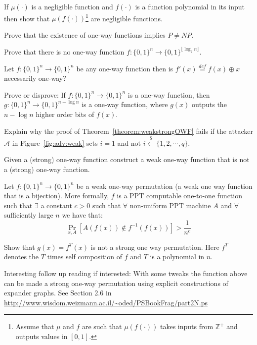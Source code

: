 \begin{exercise}
\label{ex:product} If $\mu(\cdot)$ is a negligible function and $f(\cdot)$ is a function polynomial in its input then show that $\mu(f(\cdot))$\footnote{Assume that $\mu$ and $f$ are such that $\mu(f(\cdot))$ takes inputs from $\mathbb{Z}^+$ and outputs values in $[0,1]$.} are negligible functions.
\end{exercise}

\begin{exercise}\label{ex:PNP} Prove that the existence of one-way functions implies $P \neq NP$.
\end{exercise}

\begin{exercise}
Prove that there is no one-way function $f:\{0,1\}^n\to \{0,1\}^{\lfloor \log_2 n\rfloor}$.
\end{exercise}


\begin{exercise} Let $f:\{0,1\}^n\to \{0,1\}^{n}$ be any one-way function then is $f'(x) \stackrel{def}{=} f(x)\oplus x$ necessarily one-way?
\end{exercise}

\begin{exercise}
Prove or disprove: If $f: \{0,1\}^n\rightarrow \{0,1\}^n$ is a one-way function, then $g: \{0,1\}^n\rightarrow \{0,1\}^{n-\log n}$ is a one-way function, where $g(x)$ outputs the $n-\log n$ higher order bits of $f(x)$.
\end{exercise}

\begin{exercise}
Explain why the proof of Theorem~\ref{theorem:weakstrongOWF} fails if the attacker $\mathcal{A}$ in Figure~\ref{fig:adv:weak} sets $i = 1$ and not $i \stackrel{\$}{\leftarrow} \{1, 2, \cdots, q\}$.
\end{exercise}

\begin{exercise}
Given a (strong) one-way function construct a weak one-way function that is not a (strong) one-way function.
\end{exercise}

\begin{exercise}
 Let $f:\{0,1\}^n\to \{0,1\}^{n}$ be a weak one-way permutation (a weak one way function that is a bijection). More formally, $f$ is a PPT computable one-to-one function such that $\exists$ a constant $c >0$ such that $\forall$ non-uniform PPT machine $A$ and $\forall$ sufficiently large $n$ we have that:
    \[\Pr_{x,A}[A(f(x)) \not\in f^{-1}(f(x))] > \frac{1}{n^c}\]

     Show that $g(x) = f^T(x)$ is not a strong one way permutation. Here $f^T$ denotes the $T$ times self composition of $f$ and $T$ is a polynomial in $n$.

     Interesting follow up reading if interested: With some tweaks the function above can be made a strong one-way permutation using explicit constructions of expander graphs. See Section 2.6 in \url{http://www.wisdom.weizmann.ac.il/~oded/PSBookFrag/part2N.ps}
\end{exercise}

